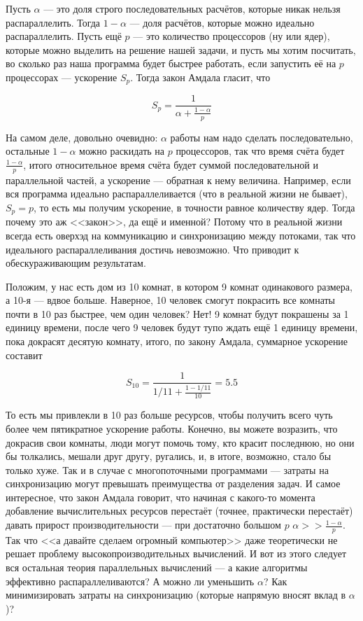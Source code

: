 \documentclass[a5paper]{article}
\begin{document}
Пусть $\alpha$ --- это доля строго последовательных расчётов, которые никак нельзя распараллелить. Тогда $1 - \alpha$ --- доля расчётов, которые можно идеально распараллелить. Пусть ещё $p$ --- это количество процессоров (ну или ядер), которые можно выделить на решение нашей задачи, и пусть мы хотим посчитать, во сколько раз наша программа будет быстрее работать, если запустить её на $p$ процессорах --- ускорение $S_p$. Тогда закон Амдала гласит, что

$$S_p = \frac{1}{\alpha + \frac{1 - \alpha}{p}}$$

На самом деле, довольно очевидно: $\alpha$ работы нам надо сделать последовательно, остальные $1 - \alpha$ можно раскидать на $p$ процессоров, так что время счёта будет $\frac{1 - \alpha}{p}$, итого относительное время счёта будет суммой последовательной и параллельной частей, а ускорение --- обратная к нему величина. Например, если вся программа идеально распараллеливается (что в реальной жизни не бывает), $S_p = p$, то есть мы получим ускорение, в точности равное количеству ядер. Тогда почему это аж <<закон>>, да ещё и именной? Потому что в реальной жизни всегда есть оверхэд на коммуникацию и синхронизацию между потоками, так что идеального распараллеливания достичь невозможно. Что приводит к обескураживающим результатам.

Положим, у нас есть дом из 10 комнат, в котором 9 комнат одинакового размера, а 10-я --- вдвое больше. Наверное, 10 человек смогут покрасить все комнаты почти в 10 раз быстрее, чем один человек? Нет! 9 комнат будут покрашены за 1 единицу времени, после чего 9 человек будут тупо ждать ещё 1 единицу времени, пока докрасят десятую комнату, итого, по закону Амдала, суммарное ускорение составит

$$S_{10} = \frac{1}{1/11 + \frac{1 - 1/11}{10}} = 5.5$$

То есть мы привлекли в 10 раз больше ресурсов, чтобы получить всего чуть более чем пятикратное ускорение работы. Конечно, вы можете возразить, что докрасив свои комнаты, люди могут помочь тому, кто красит последнюю, но они бы толкались, мешали друг другу, ругались, и, в итоге, возможно, стало бы только хуже. Так и в случае с многопоточными программами --- затраты на синхронизацию могут превышать преимущества от разделения задач. И самое интересное, что закон Амдала говорит, что начиная с какого-то момента добавление вычислительных ресурсов перестаёт (точнее, практически перестаёт) давать прирост производительности --- при достаточно большом $p$ $\alpha >> \frac{1 - \alpha}{p}$. Так что <<а давайте сделаем огромный компьютер>> даже теоретически не решает проблему высокопроизводительных вычислений. И вот из этого следует вся остальная теория параллельных вычислений --- а какие алгоритмы эффективно распараллеливаются? А можно ли уменьшить $\alpha$? Как минимизировать затраты на синхронизацию (которые напрямую вносят вклад в $\alpha$)? 
\end{document}
